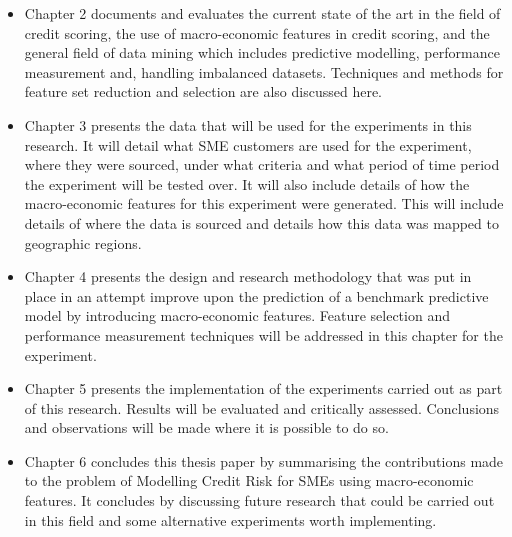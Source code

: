 \begin{itemize}
	
	\item Chapter 2 documents and evaluates the current state of the art in the field of credit scoring, the use of macro-economic features in credit scoring, and the general field of data mining which includes predictive modelling, performance measurement and, handling imbalanced datasets. Techniques and methods for feature set reduction and selection are also discussed here. 
	
	\item Chapter 3	presents the data that will be used for the experiments in this research. It will detail what SME customers are used for the experiment, where they were sourced, under what criteria and what period of time period the experiment will be tested over. It will also include details of how the macro-economic features for this experiment were generated. This will include details of where the data is sourced and details how this data was mapped to geographic regions.  
	
	\item Chapter 4 presents the design and research methodology that was put in place in an attempt improve upon the prediction of a benchmark predictive model by introducing macro-economic features. Feature selection and performance measurement techniques will be addressed in this chapter for the experiment.
	
	\item Chapter 5 presents the implementation of the experiments carried out as part of this research. Results will be evaluated and critically assessed. Conclusions and observations will be made where it is possible to do so. 
	
	\item Chapter 6 concludes this thesis paper by summarising the contributions made to the problem of Modelling Credit Risk for SMEs using macro-economic features. It concludes by discussing future research that could be carried out in this field and some alternative experiments worth implementing.
	
\end{itemize}

